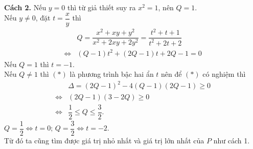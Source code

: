 \begin{bt}
{		\textbf{Cách 2.} Nếu $y=0$ thì từ giả thiết suy ra $x^2=1$, nên $Q=1$.\\
		Nếu $y\neq 0$, đặt $t=\dfrac{x}{y}$ thì 
		{\allowdisplaybreaks
			\begin{align*}
			&Q=\dfrac{x^2+xy+y^2}{x^2+2xy+2y^2}=\dfrac{t^2+t+1}{t^2+2t+2}\\
			\Leftrightarrow & (Q-1)t^2+(2Q-1)t+2Q-1=0 \tag{$*$}
			\end{align*}}Nếu $Q=1$ thì $t=-1$. \\
		Nếu $Q\neq 1$ thì $(*)$ là phương trình bậc hai ẩn $t$ nên để $(*)$ có nghiệm thì 
		{\allowdisplaybreaks
			\begin{align*}
			&\Delta=(2Q-1)^2-4(Q-1)(2Q-1)\geq 0\\
			\Leftrightarrow & (2Q-1)(3-2Q)\geq 0\\
			\Leftrightarrow &\dfrac{1}{2}\leq Q\leq \dfrac{3}{2}.
			\end{align*}}
		$Q=\dfrac{1}{2}\Leftrightarrow t=0$; $Q=\dfrac{3}{2}\Leftrightarrow t=-2$.\\
		Từ đó ta cũng tìm được giá trị nhỏ nhất và giá trị lớn nhất của $P$ như cách 1.
	}
\end{bt}

